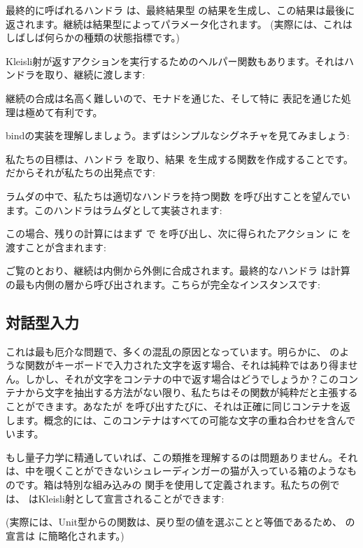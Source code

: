最終的に呼ばれるハンドラ  は、最終結果型  の結果を生成し、この結果は最後に返されます。継続は結果型によってパラメータ化されます。 (実際には、これはしばしば何らかの種類の状態指標です。) 

Kleisli射が返すアクションを実行するためのヘルパー関数もあります。それはハンドラを取り、継続に渡します: 

継続の合成は名高く難しいので、モナドを通じた、そして特に  表記を通じた処理は極めて有利です。

bindの実装を理解しましょう。まずはシンプルなシグネチャを見てみましょう: 

私たちの目標は、ハンドラ  を取り、結果  を生成する関数を作成することです。だからそれが私たちの出発点です: 

ラムダの中で、私たちは適切なハンドラを持つ関数  を呼び出すことを望んでいます。このハンドラはラムダとして実装されます: 

この場合、残りの計算にはまず  で  を呼び出し、次に得られたアクション  に  を渡すことが含まれます: 

ご覧のとおり、継続は内側から外側に合成されます。最終的なハンドラ  は計算の最も内側の層から呼び出されます。こちらが完全なインスタンスです: 


\subsection{対話型入力}

これは最も厄介な問題で、多くの混乱の原因となっています。明らかに、 のような関数がキーボードで入力された文字を返す場合、それは純粋ではあり得ません。しかし、それが文字をコンテナの中で返す場合はどうでしょうか？このコンテナから文字を抽出する方法がない限り、私たちはその関数が純粋だと主張することができます。あなたが  を呼び出すたびに、それは正確に同じコンテナを返します。概念的には、このコンテナはすべての可能な文字の重ね合わせを含んでいます。

もし量子力学に精通していれば、この類推を理解するのは問題ありません。それは、中を覗くことができないシュレーディンガーの猫が入っている箱のようなものです。箱は特別な組み込みの  関手を使用して定義されます。私たちの例では、 はKleisli射として宣言されることができます: 

 (実際には、Unit型からの関数は、戻り型の値を選ぶことと等価であるため、 の宣言は  に簡略化されます。) 

